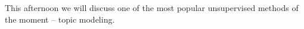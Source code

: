 \documentclass[compress]{beamer}
\begin{document}
\begin{frame}[plain]
This afternoon we will discuss one of the most popular unsupervised methods of the moment -- topic modeling.
\end{frame}


%
%
%
%
%
%


%
\end{document}
